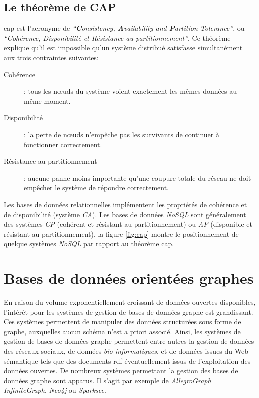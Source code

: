   \subsection{Le théorème de CAP }
  \label{sec:cap}
  \acrshort{cap} \cite{brewer2000towards} est l'acronyme de
  \textit{``\textbf{C}onsistency, \textbf{A}vailability and
    \textbf{P}artition Tolerance''}, ou \textit{``Cohérence,
    Disponibilité et Résistance au partitionnement''}. Ce théorème
  explique qu'il est impossible qu'un système distribué satisfasse
  simultanément aux trois contraintes suivantes:\medskip

  \renewcommand{\descriptionlabel}[1]{\hspace{1cm}\textbullet~\textsf{#1}}
  \begin{description}
  \item [Cohérence]: tous les nœuds du système voient exactement les
    mêmes données au même moment.

  \item [Disponibilité]: la perte de nœuds n'empêche pas les
    survivants de continuer à fonctionner correctement.

  \item [Résistance au partitionnement]: aucune panne moins importante
    qu'une coupure totale du réseau ne doit empêcher le système de
    répondre correctement.
  \end{description}
  \enddescription
  \bigskip

  

  \newpage

  Les bases de données relationnelles implémentent les propriétés de
  cohérence et de disponibilité (système \emph{CA}). Les bases de
  données \emph{NoSQL} sont généralement des systèmes \emph{CP}
  (cohérent et résistant au partitionnement) ou \emph{AP} (disponible
  et résistant au partitionnement), la figure \ref{fig:cap} montre
  le positionnement de quelque systèmes \emph{NoSQL} par rapport au
  théorème \acrshort{cap}.

\section{Bases de données orientées graphes}
\label{sec:graph-database-overview}
En raison du volume exponentiellement croissant de données ouvertes
disponibles, l'intérêt pour les systèmes de gestion de bases de
données graphe est grandissant. Ces systèmes permettent de manipuler
des données structurées sous forme de graphe, auxquelles aucun schéma
n'est a priori associé. Ainsi, les systèmes de gestion de bases de
données graphe permettent entre autres la gestion de données des
réseaux sociaux, de données \textit{bio-informatiques}, et de données
issues du Web sémantique tels que des documents \acrshort{rdf}
éventuellement issus de l'exploitation des données ouvertes. De
nombreux systèmes permettant la gestion des bases de données graphe
sont apparus. Il s'agit par exemple de \textit{AllegroGraph}
\textit{InfiniteGraph}, \textit{Neo4j} ou \textit{Sparksee}.\medskip

